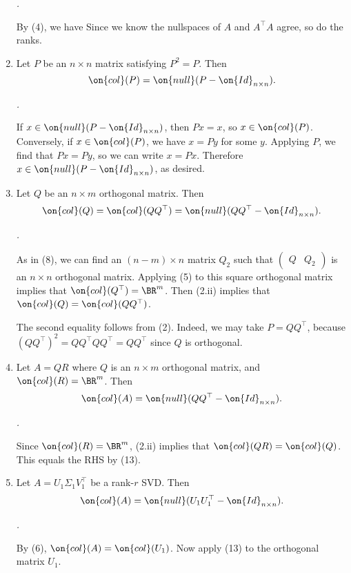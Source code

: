 \documentclass[10pt]{amsart}
\makeatletter
\renewenvironment{proof}[1][\proofname]{\par
	\pushQED{\qed}%
	\normalfont \topsep6\p@\@plus6\p@\relax
	\noindent\emph{#1.} 
	\ignorespaces
}{%
\popQED\endtrivlist\@endpefalse
}
\theoremstyle{mythm}
\theoremstyle{definition}
\theoremstyle{myrmk}
\newenvironment{myproof}{\color{blue}\begin{proof}}{\end{proof}}
\makeatother
\begin{document}
\begin{enumerate}[label=(\arabic*)]
\begin{myproof}
			By (4), we have 
			Since we know the nullspaces of $A$ and $A^\top A$ agree, so do the ranks. 
		\end{myproof}
		\item Let $P$ be an $n \times n$ matrix satisfying $P^2 = P$. Then 
		\[
		\on{col}(P) = \on{null}(P - \on{Id}_{n \times n}). 
		\]
		\begin{myproof}
			If $x \in \on{null}(P - \on{Id}_{n \times n})$, then $Px = x$, so $x \in \on{col}(P)$. Conversely, if $x \in \on{col}(P)$, we have $x = Py$ for some $y$. Applying $P$, we find that $Px = Py$, so we can write $x = Px$. Therefore $x \in \on{null}(P - \on{Id}_{n \times n})$, as desired. 
		\end{myproof}
		\item Let $Q$ be an $n \times m$ orthogonal matrix. Then 
		\[
		\on{col}(Q) = \on{col}(QQ^\top) = \on{null}(Q Q^\top - \on{Id}_{n \times n}). 
		\]
		\begin{myproof}
			As in (8), we can find an $(n-m) \times n$ matrix $Q_2$ such that $\left( \begin{array}{c|c} Q & Q_2 \end{array} \right)$ is an $n \times n$ orthogonal matrix. Applying (5) to this square orthogonal matrix implies that $\on{col}(Q^\top) = \BR^m$. Then (2.ii) implies that $\on{col}(Q) = \on{col}(QQ^\top)$. 
			
			The second equality follows from (2). Indeed, we may take $P = QQ^\top$, because $(QQ^\top)^2 = QQ^\top QQ^\top = QQ^\top$ since $Q$ is orthogonal. 
		\end{myproof}
		\item Let $A = QR$ where $Q$ is an $n \times m$ orthogonal matrix, and $\on{col}(R) = \BR^m$. Then 
		\[
		\on{col}(A) = \on{null}(QQ^\top - \on{Id}_{n \times n}). 
		\]
		\begin{myproof}
			Since $\on{col}(R) = \BR^m$, (2.ii) implies that $\on{col}(QR) = \on{col}(Q)$. This equals the RHS by (13). 
		\end{myproof}
		\item Let $A = U_1\Sigma_1 V_1^\top$ be a rank-$r$ SVD. Then 
		\[
		\on{col}(A) = \on{null}(U_1 U_1^\top - \on{Id}_{n \times n}). 
		\]
		\begin{myproof}
			By (6), $\on{col}(A) = \on{col}(U_1)$. Now apply (13) to the orthogonal matrix $U_1$. 
		\end{myproof}
	\end{enumerate}
	
\end{document}
